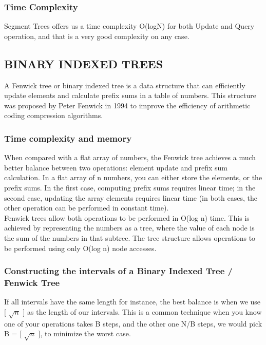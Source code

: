 \documentclass{article}
\begin{document}
\subsubsection{Time Complexity}
Segment Trees offers us a time complexity O(logN) for both Update and Query operation, and that is a very good complexity on any case.

\subsection{BINARY INDEXED TREES}

A Fenwick tree or binary indexed tree is a data structure that can efficiently update elements and calculate prefix sums in a table of numbers. This structure was proposed by Peter Fenwick in 1994 to improve the efficiency of arithmetic coding compression algorithms.
\\

\subsubsection{Time complexity and memory}

When compared with a flat array of numbers, the Fenwick tree achieves a much better balance between two operations: element update and prefix sum calculation. In a flat array of n numbers, you can either store the elements, or the prefix sums. In the first case, computing prefix sums requires linear time; in the second case, updating the array elements requires linear time (in both cases, the other operation can be performed in constant time). 
\\Fenwick trees allow both operations to be performed in  O(log n) time. This is achieved by representing the numbers as a tree, where the value of each node is the sum of the numbers in that subtree. The tree structure allows operations to be performed using only O(log n) node accesses.

\subsubsection{Constructing the intervals of a Binary Indexed Tree / Fenwick Tree}


\indent If all intervals have the same length for instance, the best balance is when we use $[$ $\sqrt{n}$ $]$ as the length of our intervals. This is a common technique when you know one of your operations takes B steps, and the other one N/B steps, we would pick B = $[$ $\sqrt{n}$ $]$, to minimize the worst case.
\end{document}
